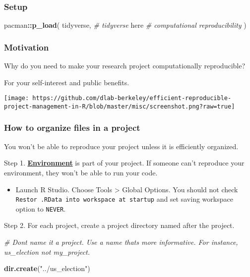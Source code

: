 \documentclass[
]{book}
\newenvironment{Shaded}{\begin{snugshade}}{\end{snugshade}}
\newcommand{\CommentTok}[1]{\textcolor[rgb]{0.56,0.35,0.01}{\textit{#1}}}
\newcommand{\KeywordTok}[1]{\textcolor[rgb]{0.13,0.29,0.53}{\textbf{#1}}}
\newcommand{\NormalTok}[1]{#1}
\newcommand{\OperatorTok}[1]{\textcolor[rgb]{0.81,0.36,0.00}{\textbf{#1}}}
\newcommand{\StringTok}[1]{\textcolor[rgb]{0.31,0.60,0.02}{#1}}
\providecommand{\tightlist}{%
  \setlength{\itemsep}{0pt}\setlength{\parskip}{0pt}}
\begin{document}
\hypertarget{setup}{%
\subsubsection{Setup}\label{setup}}

\begin{Shaded}
\begin{Highlighting}[]
\NormalTok{pacman}\OperatorTok{::}\KeywordTok{p\_load}\NormalTok{(}
\NormalTok{  tidyverse, }\CommentTok{\# tidyverse}
\NormalTok{  here }\CommentTok{\# computational reproducibility}
\NormalTok{)}
\end{Highlighting}
\end{Shaded}

\hypertarget{motivation}{%
\subsubsection{Motivation}\label{motivation}}

Why do you need to make your research project computationally reproducible?

For your self-interest and public benefits.

\texttt{[image: https://github.com/dlab-berkeley/efficient-reproducible-project-management-in-R/blob/master/misc/screenshot.png?raw=true]}

\hypertarget{how-to-organize-files-in-a-project}{%
\subsubsection{How to organize files in a project}\label{how-to-organize-files-in-a-project}}

You won't be able to reproduce your project unless it is efficiently organized.

Step 1. \href{https://environments.rstudio.com/}{\textbf{Environment}} is part of your project. If someone can't reproduce your environment, they won't be able to run your code.

\begin{itemize}
\tightlist
\item
  Launch R Studio. Choose Tools \textgreater{} Global Options. You should not check \texttt{Restor\ .RData\ into\ workspace\ at\ startup} and set saving workspace option to \texttt{NEVER}.
\end{itemize}

Step 2. For each project, create a project directory named after the project.

\begin{Shaded}
\begin{Highlighting}[]
\CommentTok{\# Don\textquotesingle{}t name it a project. Use a name that\textquotesingle{}s more informative. For instance, us\_election not my\_project.}

\KeywordTok{dir.create}\NormalTok{(}\StringTok{"../us\_election"}\NormalTok{)}
\end{Highlighting}
\end{Shaded}
\end{document}
